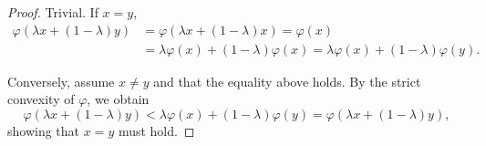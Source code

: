 \begin{proof}
  Trivial. If $x=y$,
  \begin{align*}
    \varphi (\lambda x + (1-\lambda)y) &= \varphi (\lambda x + (1-\lambda)x) = \varphi(x)
    \\ &= \lambda \varphi(x) + (1-\lambda) \varphi(x) =\lambda \varphi(x) + (1-\lambda) \varphi(y).
  \end{align*}

  Conversely, assume $x \neq y$ and that the equality above holds. By the strict convexity of $\varphi$, we obtain
  \[
  \varphi (\lambda x + (1-\lambda)y) < \lambda \varphi(x) + (1-\lambda) \varphi(y) = \varphi(\lambda x + (1-\lambda)y),
  \]
  showing that $x=y$ must hold.
\end{proof}
